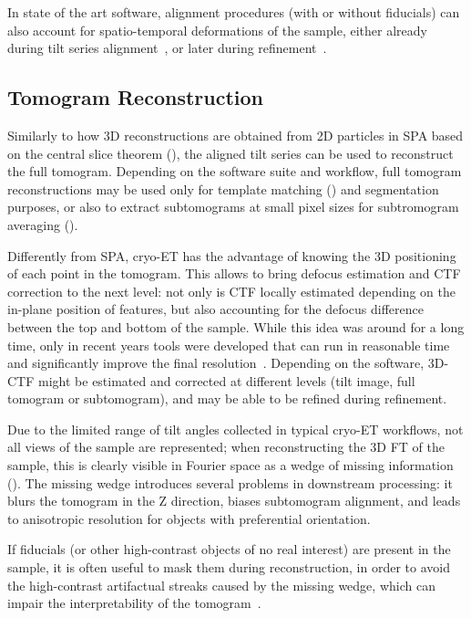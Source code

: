 In state of the art software, alignment procedures (with or without fiducials) can also account for spatio-temporal deformations of the sample, either already during tilt series alignment~\cite{zhengAreTomoIntegratedSoftware2022}, or later during refinement~\cite{tegunovMultiparticleCryoEMRefinement2021,burtImageProcessingPipeline2024,galaz-montoyaSingleParticleTomography2015,chenCompleteDataProcessing2019}.

\subsection{Tomogram Reconstruction}\label{et_tomo_reconstruction}
Similarly to how 3D reconstructions are obtained from 2D particles in SPA based on the central slice theorem (), the aligned tilt series can be used to reconstruct the full tomogram.
Depending on the software suite and workflow, full tomogram reconstructions may be used only for template matching () and segmentation purposes, or also to extract subtomograms at small pixel sizes for subtromogram averaging ().

Differently from SPA, cryo-ET has the advantage of knowing the 3D positioning of each point in the tomogram.
This allows to bring defocus estimation and CTF correction to the next level: not only is CTF locally estimated depending on the in-plane position of features, but also accounting for the defocus difference between the top and bottom of the sample.
While this idea was around for a long time, only in recent years tools were developed that can run in reasonable time and significantly improve the final resolution~\cite{turonovaEfficient3DCTFCorrection2017,tegunovRealtimeCryoelectronMicroscopy2019}. 
Depending on the software, 3D-CTF might be estimated and corrected at different levels (tilt image, full tomogram or subtomogram), and may be able to be refined during refinement.

Due to the limited range of tilt angles collected in typical cryo-ET workflows, not all views of the sample are represented; when reconstructing the 3D FT of the sample, this is clearly visible in Fourier space as a wedge of missing information ().
The missing wedge introduces several problems in downstream processing: it blurs the tomogram in the Z direction, biases subtomogram alignment, and leads to anisotropic resolution for objects with preferential orientation.

If fiducials (or other high-contrast objects of no real interest) are present in the sample, it is often useful to mask them during reconstruction, in order to avoid the high-contrast artifactual streaks caused by the missing wedge, which can impair the interpretability of the tomogram~\cite{tegunovRealtimeCryoelectronMicroscopy2019,burtTeamtomoFidder2024}.

